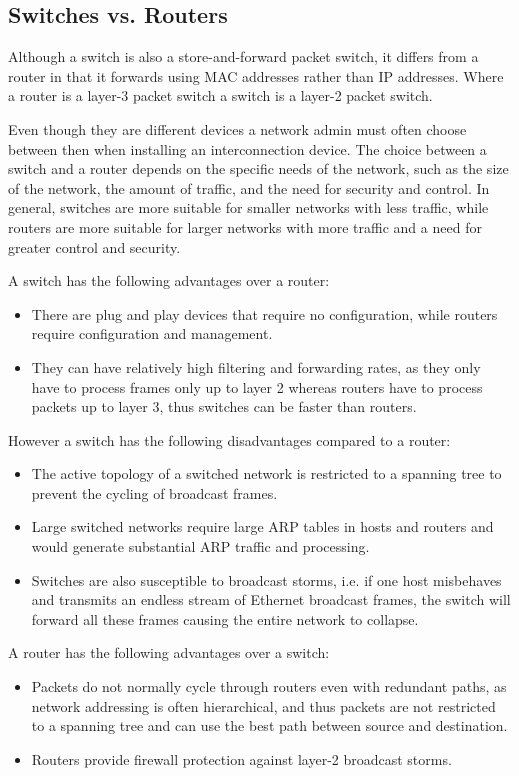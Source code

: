 \documentclass[12pt letter]{report}
\begin{document}
\subsection{Switches vs. Routers}

Although a switch is also a store-and-forward packet switch, it
differs from a router in that it forwards using MAC addresses rather
than IP addresses. Where a router is a layer-3 packet switch a switch
is a layer-2 packet switch.

Even though they are different devices a network admin must often
choose between then when installing an interconnection device. The
choice between a switch and a router depends on the specific needs of
the network, such as the size of the network, the amount of traffic,
and the need for security and control. In general, switches are more
suitable for smaller networks with less traffic, while routers are
more suitable for larger networks with more traffic and a need for
greater control and security.

A switch has the following advantages over a router:
\begin{itemize}
  \item There are plug and play devices that require no
    configuration, while routers require
    configuration and management.
  \item  They can have relatively high filtering and forwarding
    rates, as they only have to process frames only up to layer 2
    whereas routers have to process packets up to layer 3, thus
    switches can be faster than routers.
\end{itemize}

However a switch has the following disadvantages compared to a router:
\begin{itemize}
  \item  The active topology of a switched network is restricted to a
    spanning tree to prevent the cycling of broadcast frames.
  \item Large switched networks require large ARP tables in hosts and
    routers and would generate substantial ARP traffic and processing.
  \item Switches are also susceptible to broadcast storms, i.e. if
    one host misbehaves and transmits an endless stream of Ethernet
    broadcast frames, the switch will forward all these frames
    causing the entire network to collapse.
\end{itemize}

A router has the following advantages over a switch:
\begin{itemize}
  \item Packets do not normally cycle through routers even with
    redundant paths, as network addressing is often hierarchical, and
    thus packets are not restricted to a spanning tree and can use
    the best path between source and destination.
  \item Routers provide firewall protection against layer-2 broadcast storms.
\end{itemize}
\end{document}
